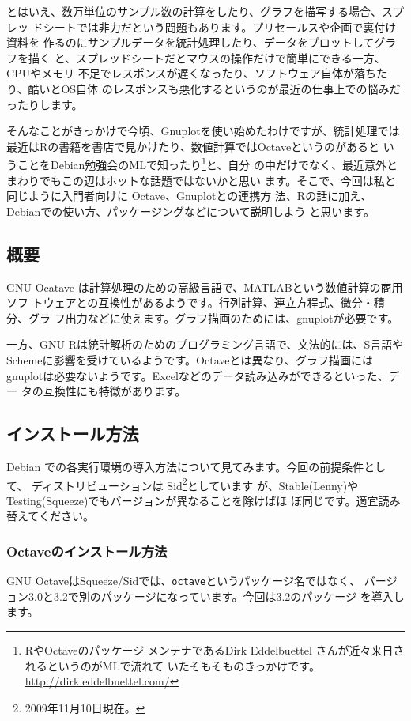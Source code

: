 \documentclass[mingoth,a4paper]{jsarticle}
\begin{document}
とはいえ、数万単位のサンプル数の計算をしたり、グラフを描写する場合、スプレッ
ドシートでは非力だという問題もあります。プリセールスや企画で裏付け資料を
作るのにサンプルデータを統計処理したり、データをプロットしてグラフを描く
と、スプレッドシートだとマウスの操作だけで簡単にできる一方、CPUやメモリ
不足でレスポンスが遅くなったり、ソフトウェア自体が落ちたり、酷いとOS自体
のレスポンスも悪化するというのが最近の仕事上での悩みだったりします。

そんなことがきっかけで今頃、Gnuplotを使い始めたわけですが、統計処理では
最近はRの書籍を書店で見かけたり、数値計算ではOctaveというのがあると
いうことをDebian勉強会のMLで知ったり\footnote{RやOctaveのパッケージ
メンテナであるDirk Eddelbuettel さんが近々来日されるというのがMLで流れて
いたそもそものきっかけです。\url{http://dirk.eddelbuettel.com/}}と、自分
の中だけでなく、最近意外とまわりでもこの辺はホットな話題ではないかと思い
ます。そこで、今回は私と同じように入門者向けに Octave、Gnuplotとの連携方
法、Rの話に加え、Debianでの使い方、パッケージングなどについて説明しよう
と思います。


\subsection{概要}
GNU Ocatave は計算処理のための高級言語で、MATLABという数値計算の商用ソフ
トウェアとの互換性があるようです。行列計算、連立方程式、微分・積分、グラ
フ出力などに使えます。グラフ描画のためには、gnuplotが必要です。

一方、GNU Rは統計解析のためのプログラミング言語で、文法的には、S言語や
Schemeに影響を受けているようです。Octaveとは異なり、グラフ描画には
gnuplotは必要ないようです。Excelなどのデータ読み込みができるといった、デー
タの互換性にも特徴があります。


\subsection{インストール方法}

Debian での各実行環境の導入方法について見てみます。今回の前提条件として、
ディストリビューションは Sid\footnote{2009年11月10日現在。}としています
が、Stable(Lenny)や Testing(Squeeze)でもバージョンが異なることを除けばほ
ぼ同じです。適宜読み替えてください。

\subsubsection{Octaveのインストール方法}

GNU OctaveはSqueeze/Sidでは、\texttt{octave}というパッケージ名ではなく、
バージョン3.0と3.2で別のパッケージになっています。今回は3.2のパッケージ
を導入します。
\end{document}
